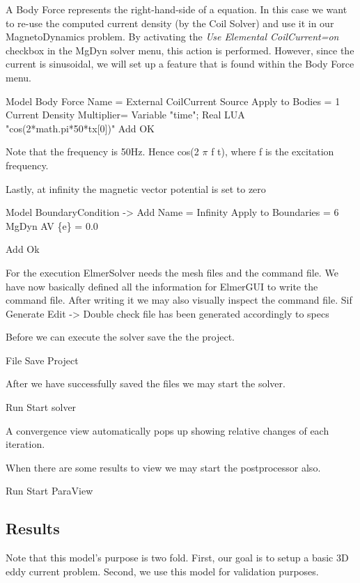 A Body Force represents the right-hand-side of a equation.  In this case we want to re-use the computed current density (by the Coil Solver) and use it in our MagnetoDynamics problem. By activating the \textit{ Use Elemental CoilCurrent=on} checkbox in the MgDyn solver menu, this action is performed.  However, since the current is sinusoidal, we will set up a feature that is found within the Body Force menu. 



\ttbegin
Model
  Body Force
    Name = External CoilCurrent Source
    Apply to Bodies = 1
    Current Density Multiplier= Variable "time"; Real LUA "cos(2*math.pi*50*tx[0])"
    Add 
    OK
\ttend    

Note that the frequency is 50Hz.  Hence  cos(2 $\pi$ f t), where f is the excitation frequency. 

\clearpage
\noindent Lastly,  at infinity the magnetic vector potential is set to zero

\ttbegin
Model
  BoundaryCondition -> Add
      Name = Infinity
      Apply to Boundaries = 6
      MgDyn
          AV \{e\} = 0.0
      
    Add
    Ok
\ttend   



For the execution ElmerSolver needs the mesh files and the command file.  We have now basically defined all the information for ElmerGUI to write the command file. After writing it we may also visually inspect the command file.
\ttbegin
Sif 
  Generate
  Edit -> Double check file has been generated accordingly to specs
\ttend

Before we can execute the solver save the the project. 

\ttbegin
File 
  Save Project
\ttend

After we have successfully saved the files we may start the solver.

\ttbegin
Run
  Start solver
\ttend

A convergence view automatically pops up showing relative changes of each iteration.

When there are some results to view we may start the postprocessor also.

\ttbegin
Run
  Start ParaView
\ttend

\clearpage
\subsection*{Results}

Note that this model's purpose is two fold.  First,  our goal is to setup a basic 3D eddy current problem.  Second,  we use this model for validation purposes.  

